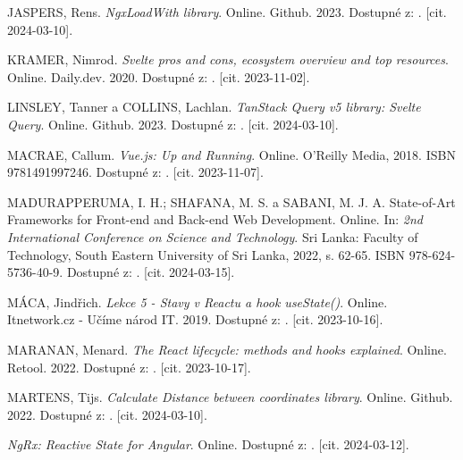 \begin{thebibliography}{99}
\textsc{JASPERS}, Rens. \emph{NgxLoadWith library}. Online. Github. 2023. Dostupné z: . [cit. 2024-03-10].

\textsc{KRAMER}, Nimrod. \emph{Svelte pros and cons, ecosystem overview and top resources}. Online. Daily.dev. 2020. Dostupné z: . [cit. 2023-11-02].

\textsc{LINSLEY}, Tanner a \textsc{COLLINS}, Lachlan. \emph{TanStack Query v5 library: Svelte Query}. Online. Github. 2023. Dostupné z: . [cit. 2024-03-10].

\textsc{MACRAE}, Callum. \emph{Vue.js: Up and Running}. Online. O'Reilly Media, 2018. ISBN 9781491997246. Dostupné z: . [cit. 2023-11-07].

\textsc{MADURAPPERUMA}, I. H.; \textsc{SHAFANA}, M. S. a \textsc{SABANI}, M. J. A. State-of-Art Frameworks for Front-end and Back-end Web Development. Online. In: \emph{2nd International Conference on Science and Technology}. Sri Lanka: Faculty of Technology, South Eastern University of Sri Lanka, 2022, s. 62-65. ISBN 978-624-5736-40-9. Dostupné z: . [cit. 2024-03-15].

\textsc{MÁCA}, Jindřich. \emph{Lekce 5 - Stavy v Reactu a hook useState()}. Online. Itnetwork.cz - Učíme národ IT. 2019. Dostupné z: . [cit. 2023-10-16].

\textsc{MARANAN}, Menard. \emph{The React lifecycle: methods and hooks explained}. Online. Retool. 2022. Dostupné z: . [cit. 2023-10-17].

\textsc{MARTENS}, Tijs. \emph{Calculate Distance between coordinates library}. Online. Github. 2022. Dostupné z: . [cit. 2024-03-10].

\emph{NgRx: Reactive State for Angular}. Online. Dostupné z: . [cit. 2024-03-12].


\end{thebibliography}
